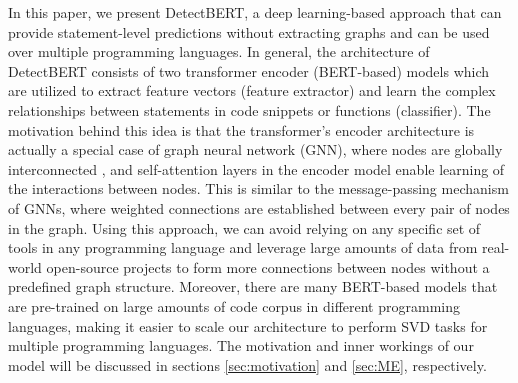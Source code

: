 \documentclass{ieeeaccess}
\begin{document}
\par %
In this paper, we present DetectBERT, a deep learning-based approach that can provide statement-level predictions without extracting graphs and can be used over multiple programming languages. In general, the architecture of DetectBERT consists of  two transformer encoder (BERT-based) models which are utilized to extract feature vectors (feature extractor) and learn the complex relationships between statements in code snippets or functions (classifier). The motivation behind this idea is that  the transformer's encoder architecture is actually a special case of graph neural network (GNN), where nodes are globally interconnected \cite{transformer2graph}, and self-attention layers in the encoder model enable learning of the interactions between nodes. This is similar to the message-passing mechanism of GNNs, where weighted connections are established between every pair of nodes in the graph. Using this approach, we can avoid relying on any specific set of tools in any programming language and leverage large amounts of data from real-world open-source projects to form more connections between nodes without a predefined graph structure. Moreover, there are many BERT-based models \cite{sBERT,codebert, minilm,mpnet, zhou2023codeBERTscore} that are pre-trained on large amounts of code corpus in different programming languages, making it easier to scale our architecture to perform SVD tasks for multiple programming languages. The motivation and inner workings of our model will be discussed in sections \ref{sec:motivation} and \ref{sec:ME}, respectively.
\end{document}

